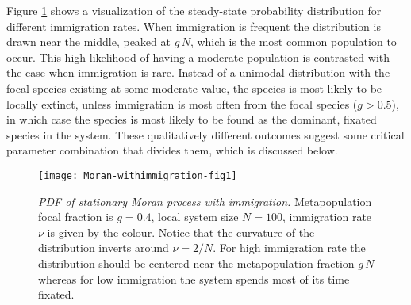 Figure \ref{stationary-fig2} shows a visualization of the steady-state probability distribution for different immigration rates. %
When immigration is frequent the distribution is drawn near the middle, peaked at $g\,N$, which is the most common population to occur. 
This high likelihood of having a moderate population is contrasted with the case when immigration is rare. 
Instead of a unimodal distribution with the focal species existing at some moderate value, the species is most likely to be locally extinct, unless immigration is most often from the focal species ($g>0.5$), in which case the species is most likely to be found as the dominant, fixated species in the system. 
These qualitatively different outcomes suggest some critical parameter combination that divides them, which is discussed below. 
\setlength{\unitlength}{1.0cm}
\begin{figure}[h]
	\centering
	\texttt{[image: Moran-withimmigration-fig1]}
	\caption{\emph{PDF of stationary Moran process with immigration.} Metapopulation focal fraction is $g=0.4$, local system size $N=100$, immigration rate $\nu$ is given by the colour. Notice that the curvature of the distribution inverts around $\nu=2/N$. For high immigration rate the distribution should be centered near the metapopulation fraction $g\,N$ whereas for low immigration the system spends most of its time fixated. } \label{stationary-fig2}
\end{figure}

